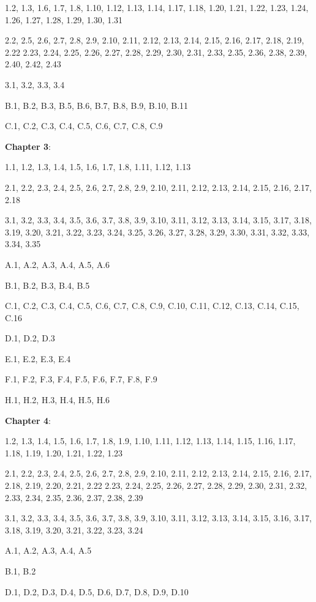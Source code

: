 \documentclass{article}
\begin{document}
1.2, 1.3, 1.6, 1.7, 1.8, 1.10, 1.12, 1.13, 1.14, 1.17, 1.18, 1.20, 1.21, 1.22, 1.23, 1.24, 1.26, 1.27, 1.28, 1.29, 1.30, 1.31

2.2, 2.5, 2.6, 2.7, 2.8, 2.9, 2.10, 2.11, 2.12, 2.13, 2.14, 2.15, 2.16, 2.17, 2.18, 2.19, 2.22 2.23, 2.24, 2.25, 2.26, 2.27, 2.28, 2.29, 2.30, 2.31, 2.33, 2.35, 2.36, 2.38, 2.39, 2.40, 2.42, 2.43

3.1, 3.2, 3.3, 3.4

B.1, B.2, B.3, B.5, B.6, B.7, B.8, B.9, B.10, B.11

C.1, C.2, C.3, C.4, C.5, C.6, C.7, C.8, C.9
\medskip

\textbf{Chapter 3}:
\medskip

1.1, 1.2, 1.3, 1.4, 1.5, 1.6, 1.7, 1.8, 1.11, 1.12, 1.13

2.1, 2.2, 2.3, 2.4, 2.5, 2.6, 2.7, 2.8, 2.9, 2.10, 2.11, 2.12, 2.13, 2.14, 2.15, 2.16, 2.17, 2.18

3.1, 3.2, 3.3, 3.4, 3.5, 3.6, 3.7, 3.8, 3.9, 3.10, 3.11, 3.12, 3.13, 3.14, 3.15, 3.17, 3.18, 3.19, 3.20, 3.21, 3.22, 3.23, 3.24, 3.25, 3.26, 3.27, 3.28, 3.29, 3.30, 3.31, 3.32, 3.33, 3.34, 3.35

A.1, A.2, A.3, A.4, A.5, A.6

B.1, B.2, B.3, B.4, B.5

C.1, C.2, C.3, C.4, C.5, C.6, C.7, C.8, C.9, C.10, C.11, C.12, C.13, C.14, C.15, C.16

D.1, D.2, D.3

E.1, E.2, E.3, E.4

F.1, F.2, F.3, F.4, F.5, F.6, F.7, F.8, F.9

H.1, H.2, H.3, H.4, H.5, H.6
\medskip

\textbf{Chapter 4}:
\medskip

1.2, 1.3, 1.4, 1.5, 1.6, 1.7, 1.8, 1.9, 1.10, 1.11, 1.12, 1.13, 1.14, 1.15, 1.16, 1.17, 1.18, 1.19, 1.20, 1.21, 1.22, 1.23

2.1, 2.2, 2.3, 2.4, 2.5, 2.6, 2.7, 2.8, 2.9, 2.10, 2.11, 2.12, 2.13, 2.14, 2.15, 2.16, 2.17, 2.18, 2.19, 2.20, 2.21, 2.22 2.23, 2.24, 2.25, 2.26, 2.27, 2.28, 2.29, 2.30, 2.31, 2.32, 2.33, 2.34, 2.35, 2.36, 2.37, 2.38, 2.39

3.1, 3.2, 3.3, 3.4, 3.5, 3.6, 3.7, 3.8, 3.9, 3.10, 3.11, 3.12, 3.13, 3.14, 3.15, 3.16, 3.17, 3.18, 3.19, 3.20, 3.21, 3.22, 3.23, 3.24

A.1, A.2, A.3, A.4, A.5

B.1, B.2

D.1, D.2, D.3, D.4, D.5, D.6, D.7, D.8, D.9, D.10
\end{document}
